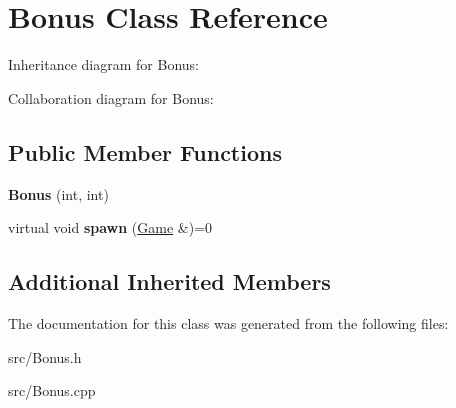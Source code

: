 \hypertarget{class_bonus}{}\section{Bonus Class Reference}
\label{class_bonus}


Inheritance diagram for Bonus\+:


Collaboration diagram for Bonus\+:
\subsection*{Public Member Functions}
\begin{DoxyCompactItemize}
\item 
\mbox{\label{class_bonus_a7880a9578badb157da5a12ef2915b0fd}} 
{\bfseries Bonus} (int, int)
\item 
\mbox{\label{class_bonus_a4124d2c02af725f62bea01322a00c72f}} 
virtual void {\bfseries spawn} (\mbox{\hyperlink{class_game}{Game}} \&)=0
\end{DoxyCompactItemize}
\subsection*{Additional Inherited Members}


The documentation for this class was generated from the following files\+:\begin{DoxyCompactItemize}
\item 
src/Bonus.\+h\item 
src/Bonus.\+cpp\end{DoxyCompactItemize}
